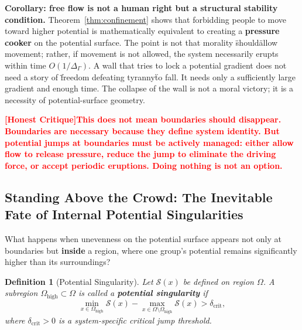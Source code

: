 \documentclass[12pt,a4paper]{article}
\newtheorem{definition}[theorem]{Definition}
\theoremstyle{remark}
\newcommand{\honestcrit}[1]{%
    \textcolor{red}{\textbf{[Honest Critique]#1}}%
}
\begin{document}
\textbf{Corollary: free flow is not a human right but a structural stability condition.} Theorem~\ref{thm:confinement} shows that forbidding people to move toward higher potential is mathematically equivalent to creating a \textbf{pressure cooker} on the potential surface. The point is not that morality \"should\" allow movement; rather, if movement is not allowed, the system necessarily erupts within time $O(1/\Delta_\Gamma)$. A wall that tries to lock a potential gradient does not need a story of \"freedom defeating tyranny\" to fall. It needs only a sufficiently large gradient and enough time. The collapse of the wall is not a moral victory; it is a necessity of potential-surface geometry.

\honestcrit{This does not mean boundaries should disappear. Boundaries are necessary because they define system identity. But potential jumps at boundaries must be actively managed: either allow flow to release pressure, reduce the jump to eliminate the driving force, or accept periodic eruptions. Doing nothing is not an option.}

\subsection{Standing Above the Crowd: The Inevitable Fate of Internal Potential Singularities}

What happens when unevenness on the potential surface appears not only at boundaries but \textbf{inside} a region, where one group's potential remains significantly higher than its surroundings?

\begin{definition}[Potential Singularity]\label{def:singularity}
Let $\mathcal{S}(x)$ be defined on region $\Omega$. A subregion $\Omega_{\text{high}} \subset \Omega$ is called a \textbf{potential singularity} if
\begin{equation}
    \min_{x \in \Omega_{\text{high}}} \mathcal{S}(x) - \max_{x \in \Omega \setminus \Omega_{\text{high}}} \mathcal{S}(x) > \delta_{\text{crit}},
\end{equation}
where $\delta_{\text{crit}} > 0$ is a system-specific critical jump threshold.
\end{definition}
\end{document}
